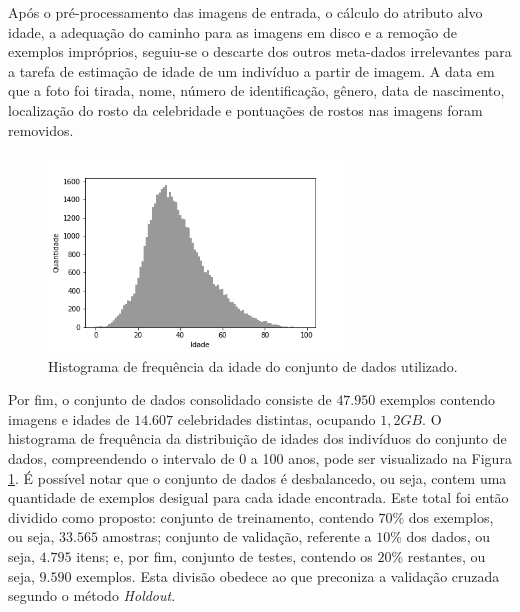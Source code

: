Após o pré-processamento das imagens de entrada, o cálculo do atributo alvo idade, a adequação do caminho para as imagens em disco e a remoção de exemplos impróprios, seguiu-se o descarte dos outros meta-dados irrelevantes para a tarefa de estimação de idade de um indivíduo a partir de imagem. A data em que a foto foi tirada, nome, número de identificação, gênero, data de nascimento, localização do rosto da celebridade e pontuações de rostos nas imagens foram removidos.

\begin{figure}[!ht]
    \centering
     \includegraphics[width=0.7\textwidth]{img/idade_hist_clean}
     \caption{Histograma de frequência da idade do conjunto de dados utilizado.}
     \label{fig:hist}
\end{figure}

Por fim, o conjunto de dados consolidado consiste de $47.950$ exemplos contendo imagens e idades de $14.607$ celebridades distintas, ocupando $1,2 GB$. O histograma de frequência da distribuição de idades dos indivíduos do conjunto de dados, compreendendo o intervalo de 0 a 100 anos, pode ser visualizado na Figura \ref{fig:hist}. É possível notar que o conjunto de dados é desbalancedo, ou seja, contem uma quantidade de exemplos desigual para cada idade encontrada. Este total foi então dividido como proposto: conjunto de treinamento, contendo $70\%$ dos exemplos, ou seja, $33.565$ amostras; conjunto de validação, referente a $10\%$ dos dados, ou seja, $4.795$ itens; e, por fim, conjunto de testes, contendo os $20\%$ restantes, ou seja, $9.590$ exemplos. Esta divisão obedece ao que preconiza a validação cruzada segundo o método \emph{Holdout}.
